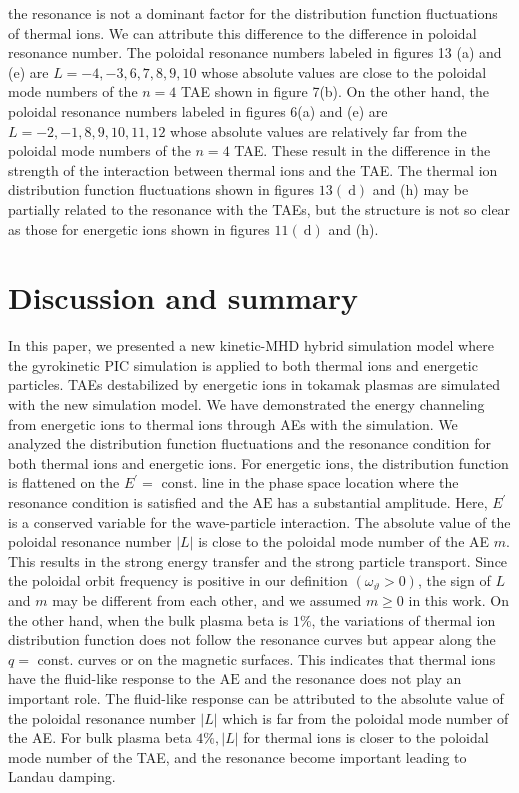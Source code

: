 \documentclass[10pt]{article}
\begin{document}
the resonance is not a dominant factor for the distribution function fluctuations of thermal ions. We can attribute this difference to the difference in poloidal resonance number. The poloidal resonance numbers labeled in figures 13 (a) and (e) are $L=-4,-3,6,7,8,9,10$ whose absolute values are close to the poloidal mode numbers of the $n=4$ TAE shown in figure 7(b). On the other hand, the poloidal resonance numbers labeled in figures 6(a) and (e) are $L=-2,-1,8,9,10,11,12$ whose absolute values are relatively far from the poloidal mode numbers of the $n=4$ TAE. These result in the difference in the strength of the interaction between thermal ions and the TAE. The thermal ion distribution function fluctuations shown in figures $13(\mathrm{~d})$ and (h) may be partially related to the resonance with the TAEs, but the structure is not so clear as those for energetic ions shown in figures $11(\mathrm{~d})$ and (h).

\section{Discussion and summary}
In this paper, we presented a new kinetic-MHD hybrid simulation model where the gyrokinetic PIC simulation is applied to both thermal ions and energetic particles. TAEs destabilized by energetic ions in tokamak plasmas are simulated with the new simulation model. We have demonstrated the energy channeling from energetic ions to thermal ions through AEs with the simulation. We analyzed the distribution function fluctuations and the resonance condition for both thermal ions and energetic ions. For energetic ions, the distribution function is flattened on the $E^{\prime}=$ const. line in the phase space location where the resonance condition is satisfied and the $\mathrm{AE}$ has a substantial amplitude. Here, $E^{\prime}$ is a conserved variable for the wave-particle interaction. The absolute value of the poloidal resonance number $|L|$ is close to the poloidal mode number of the AE $m$. This results in the strong energy transfer and the strong particle transport. Since the poloidal orbit frequency is positive in our definition $\left(\omega_{\vartheta}>0\right)$, the sign of $L$ and $m$ may be different from each other, and we assumed $m \geq 0$ in this work. On the other hand, when the bulk plasma beta is $1 \%$, the variations of thermal ion distribution function does not follow the resonance curves but appear along the $q=$ const. curves or on the magnetic surfaces. This indicates that thermal ions have the fluid-like response to the $\mathrm{AE}$ and the resonance does not play an important role. The fluid-like response can be attributed to the absolute value of the poloidal resonance number $|L|$ which is far from the poloidal mode number of the AE. For bulk plasma beta $4 \%,|L|$ for thermal ions is closer to the poloidal mode number of the TAE, and the resonance become important leading to Landau damping.
\end{document}
